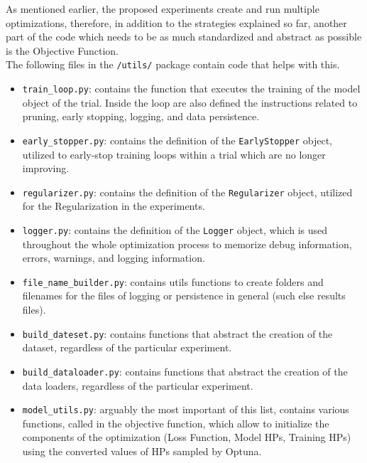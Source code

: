 As mentioned earlier, the proposed experiments create and run multiple optimizations, therefore, in addition to the strategies explained so far, another part of the code which needs to be as much standardized and abstract as possible is the Objective Function.
\\[0.3cm]The following files in the \texttt{/utils/} package contain code that helps with this.
\begin{itemize}[itemsep=0.1cm]
    \item \texttt{train\_loop.py}: contains the function that executes the training of the model object of the trial. Inside the loop are also defined the instructions related to pruning, early stopping, logging, and data persistence.
    \item \texttt{early\_stopper.py}: contains the definition of the \texttt{EarlyStopper} object, utilized to early-stop training loops within a trial which are no longer improving.
    \item \texttt{regularizer.py}: contains the definition of the \texttt{Regularizer} object, utilized for the Regularization in the experiments.
    \item \texttt{logger.py}: contains the definition of the \texttt{Logger} object, which is used throughout the whole optimization process to memorize debug information, errors, warnings, and logging information.
    \item \texttt{file\_name\_builder.py}: contains utils functions to create folders and filenames for the files of logging or persistence in general (such else results files).
    \item \texttt{build\_dateset.py}: contains functions that abstract the creation of the dataset, regardless of the particular experiment.
    \item \texttt{build\_dataloader.py}: contains functions that abstract the creation of the data loaders, regardless of the particular experiment.
    \item \texttt{model\_utils.py}: arguably the most important of this list, contains various functions, called in the objective function, which allow to initialize the components of the optimization (Loss Function, Model HPs, Training HPs) using the converted values of HPs sampled by Optuna.
\end{itemize}
% 
